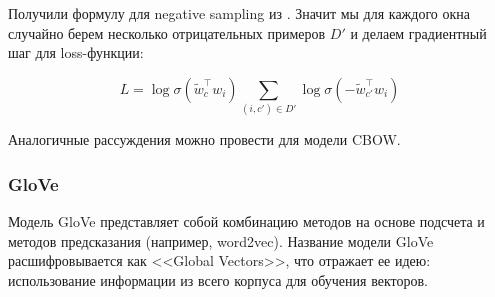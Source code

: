 Получили формулу для negative sampling из \cite{Mikolov:2}. Значит мы для каждого окна случайно берем
несколько отрицательных примеров $D'$ и делаем градиентный шаг для loss-функции:

\begin{equation}
 L = \log\sigma(\tilde{w}_c^{\top} w_i) \sum_{(i,c')\in D'} \log\sigma(-\tilde{w}_{c'}^{\top} w_i)
\end{equation}

Аналогичные рассуждения можно провести для модели CBOW.


\subsubsection{GloVe}

Модель GloVe \cite{Pennington} представляет собой комбинацию методов на основе подсчета и методов предсказания (например, word2vec). Название модели GloVe расшифровывается как <<Global Vectors>>, что отражает ее идею: использование информации из всего корпуса для обучения векторов.






